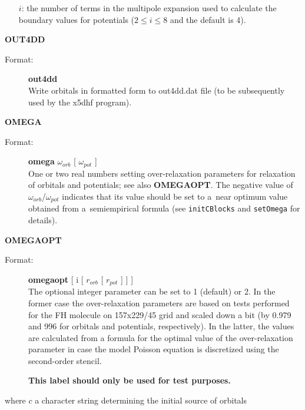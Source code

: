 \documentclass[10pt,a4paper]{article}
\newcommand{\ft}[1]{\texttt{#1}}
\begin{document}
\begin{description}
\begin{description}
\begin{itemize}
\item[$i$:] the number of terms in the multipole expansion used to calculate
  the boundary values for potentials ($2 \le i\le 8$ and the default is 4).
\end{itemize}
\end{description}

\item \textbf{OUT4DD}
\begin{description}
\item[Format:] \textbf{out4dd}  \\ 
  Write orbitals in formatted form to out4dd.dat file (to be subsequently
  used by the x5dhf program).
\end{description}


\item \textbf{OMEGA}
\begin{description}
\item[Format:] \textbf{omega} $\omega_{orb}$ [ $\omega_{pot}$ ] \\ 
  One or two real numbers setting over-relaxation parameters for relaxation
  of orbitals and potentials; see also \textbf{OMEGAOPT}. The negative
  value of $\omega_{orb}$/$\omega_{pot}$ indicates that its value should be
  set to a~near optimum value obtained from a~semiempirical formula (see
  \ft{initCBlocks} and \ft{setOmega} for details).
\end{description}

\newpage

\item \textbf{OMEGAOPT}
\begin{description}
\item[Format:] \textbf{omegaopt} [ i [ $r_{orb}$ [ $r_{pot}$ ] ] ] \\
  The optional integer parameter can be set to 1 (default) or 2. In the
  former case the over-relaxation parameters are based on tests performed
  for the FH molecule on 157x229/45 grid and scaled down a bit (by 0.979
  and 996 for orbitals and potentials, respectively). In the latter, the
  values are calculated from a formula for the optimal value of the
  over-relaxation parameter in case the model Poisson equation is
  discretized using the second-order stencil.

  \textbf{This label should only be used for test purposes.}
\end{description}

where $c$ a character string determining the initial source of orbitals


\end{description}
\end{document}
